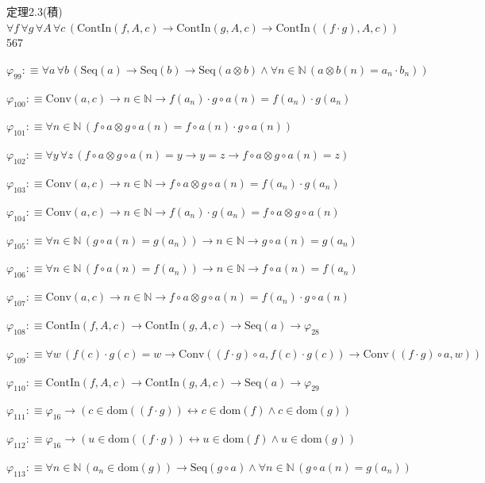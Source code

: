 \begin{fullproof}{定理2.3(積)}{$\forall f\,\forall g\,\forall A\,\forall c\,(\mathrm{ContIn}(f,A,c) \to \mathrm{ContIn}(g,A,c) \to \mathrm{ContIn}((f \cdot g),A,c))$}{567}
\begin{abbrevlist}
\item $\varphi_{99} :\equiv \forall a\,\forall b\,(\mathrm{Seq}(a) \to \mathrm{Seq}(b) \to \mathrm{Seq}(a \otimes b) \land \forall n \in \mathbb{N}\,(a \otimes b(n) = a_{n} \cdot b_{n}))$
\item $\varphi_{100} :\equiv \mathrm{Conv}(a,c) \to n \in \mathbb{N} \to f(a_{n}) \cdot g \circ a(n) = f(a_{n}) \cdot g(a_{n})$
\item $\varphi_{101} :\equiv \forall n \in \mathbb{N}\,(f \circ a \otimes g \circ a(n) = f \circ a(n) \cdot g \circ a(n))$
\item $\varphi_{102} :\equiv \forall y\,\forall z\,(f \circ a \otimes g \circ a(n) = y \to y = z \to f \circ a \otimes g \circ a(n) = z)$
\item $\varphi_{103} :\equiv \mathrm{Conv}(a,c) \to n \in \mathbb{N} \to f \circ a \otimes g \circ a(n) = f(a_{n}) \cdot g(a_{n})$
\item $\varphi_{104} :\equiv \mathrm{Conv}(a,c) \to n \in \mathbb{N} \to f(a_{n}) \cdot g(a_{n}) = f \circ a \otimes g \circ a(n)$
\item $\varphi_{105} :\equiv \forall n \in \mathbb{N}\,(g \circ a(n) = g(a_{n})) \to n \in \mathbb{N} \to g \circ a(n) = g(a_{n})$
\item $\varphi_{106} :\equiv \forall n \in \mathbb{N}\,(f \circ a(n) = f(a_{n})) \to n \in \mathbb{N} \to f \circ a(n) = f(a_{n})$
\item $\varphi_{107} :\equiv \mathrm{Conv}(a,c) \to n \in \mathbb{N} \to f \circ a \otimes g \circ a(n) = f(a_{n}) \cdot g \circ a(n)$
\item $\varphi_{108} :\equiv \mathrm{ContIn}(f,A,c) \to \mathrm{ContIn}(g,A,c) \to \mathrm{Seq}(a) \to \varphi_{28}$
\item $\varphi_{109} :\equiv \forall w\,(f(c) \cdot g(c) = w \to \mathrm{Conv}((f \cdot g) \circ a,f(c) \cdot g(c)) \to \mathrm{Conv}((f \cdot g) \circ a,w))$
\item $\varphi_{110} :\equiv \mathrm{ContIn}(f,A,c) \to \mathrm{ContIn}(g,A,c) \to \mathrm{Seq}(a) \to \varphi_{29}$
\item $\varphi_{111} :\equiv \varphi_{16} \to (c \in \mathrm{dom}((f \cdot g)) \leftrightarrow c \in \mathrm{dom}(f) \land c \in \mathrm{dom}(g))$
\item $\varphi_{112} :\equiv \varphi_{16} \to (u \in \mathrm{dom}((f \cdot g)) \leftrightarrow u \in \mathrm{dom}(f) \land u \in \mathrm{dom}(g))$
\item $\varphi_{113} :\equiv \forall n \in \mathbb{N}\,(a_{n} \in \mathrm{dom}(g)) \to \mathrm{Seq}(g \circ a) \land \forall n \in \mathbb{N}\,(g \circ a(n) = g(a_{n}))$

\end{abbrevlist}
\end{fullproof}
